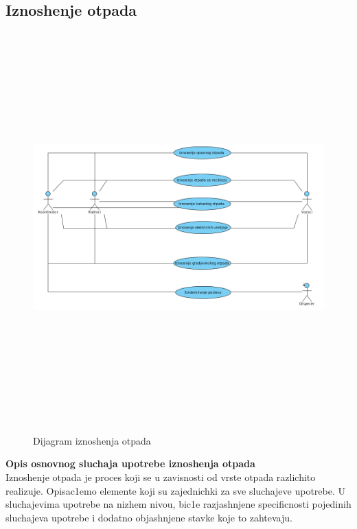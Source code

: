 \documentclass[10 pt]{article}
\begin{document}
	
	\subsection{Iznoshenje otpada}
	
	\begin{figure}[H]
		\centering
		\includegraphics[width=15cm,height=15cm,keepaspectratio]{slike/UCIznosenjeSmeca.png}\\
		\caption{Dijagram iznoshenja otpada}
	\end{figure}
	
	\textbf{Opis osnovnog sluchaja upotrebe iznoshenja otpada}\\
		
	Iznoshenje otpada je proces koji se u zavisnosti od vrste otpada razlichito realizuje.
	Opisac1emo elemente koji su zajednichki za sve sluchajeve upotrebe.
	U sluchajevima upotrebe na nizhem nivou, bic1e razjashnjene specificnosti
	pojedinih sluchajeva upotrebe i dodatno objashnjene stavke koje to zahtevaju.
	
\end{document}
